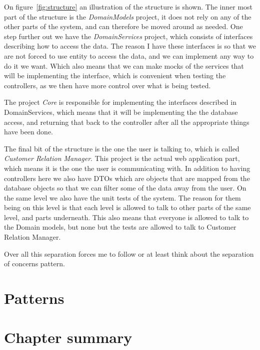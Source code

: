On figure~\ref{fig:structure} an illustration of the structure is shown. The inner most part of the structure is the \textit{DomainModels} project, it does not rely on any of the other parts of the system, and can therefore be moved around as needed. One step further out we have the \textit{DomainServices} project, which consists of interfaces describing how to access the data. The reason I have these interfaces is so that we are not forced to use entity to access the data, and we can implement any way to do it we want. Which also means that we can make mocks of the services that will be implementing the interface, which is convenient when testing the controllers, as we then have more control over what is being tested.

The project \textit{Core} is responsible for implementing the interfaces described in DomainServices, which means that it will be implementing the the database access, and returning that back to the controller after all the appropriate things have been done.

The final bit of the structure is the one the user is talking to, which is called \textit{Customer Relation Manager}. This project is the actual web application part, which means it is the one the user is communicating with. In addition to having controllers here we also have DTOs which are objects that are mapped from the database objects so that we can filter some of the data away from the user. On the same level we also have the unit tests of the system. The reason for them being on this level is that each level is allowed to talk to other parts of the same level, and parts underneath. This also means that everyone is allowed to talk to the Domain models, but none but the tests are allowed to talk to Customer Relation Manager.

Over all this separation forces me to follow or at least think about the separation of concerns pattern.

\section{Patterns}
\label{sec:Patterns}

\section{Chapter summary}
